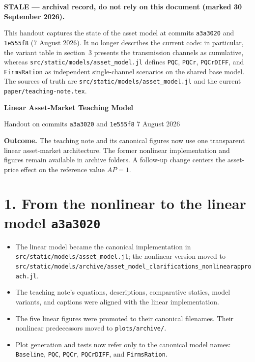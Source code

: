 \documentclass[10pt,a4paper]{article}
\newcommand{\commit}[1]{\texttt{#1}}
\newcommand{\pathcode}[1]{\texttt{\small #1}}
\begin{document}
\small

\colorbox{stale}{%
  \parbox{\dimexpr\textwidth-2\fboxsep\relax}{%
    \color{white}\bfseries STALE --- archival record, do not rely on this
    document (marked 30 September 2026).\par\medskip
    \mdseries This handout captures the state of the asset model at commits
    \commit{a3a3020} and \commit{1e555f8} (7 August 2026). It no longer
    describes the current code: in particular, the variant table in section~3
    presents the transmission channels as cumulative, whereas
    \pathcode{src/static/models/asset\_model.jl} defines \texttt{PQC},
    \texttt{PQCr}, \texttt{PQCrDIFF}, and \texttt{FirmsRation} as independent
    single-channel scenarios on the shared base model. The sources of truth are
    \pathcode{src/static/models/asset\_model.jl} and the current
    \pathcode{paper/teaching-note.tex}.}%
}\par

\vspace{2mm}

{\color{accent}\LARGE\bfseries Linear Asset-Market Teaching Model}\par
{\large Handout on commits \commit{a3a3020} and \commit{1e555f8}}\hfill
{\small 7 August 2026}

\vspace{1mm}
\colorbox{light}{%
  \parbox{\dimexpr\textwidth-2\fboxsep\relax}{%
    \textbf{Outcome.} The teaching note and its canonical figures now use one
    transparent linear asset-market architecture. The former nonlinear
    implementation and figures remain available in archive folders. A follow-up
    change centers the asset-price effect on the reference value $AP=1$.
  }%
}

\section*{1. From the nonlinear to the linear model \hfill\normalfont\commit{a3a3020}}

\begin{itemize}
  \item The linear model became the canonical implementation in
    \pathcode{src/static/models/asset\_model.jl}; the nonlinear version moved to
    \pathcode{src/static/models/archive/asset\_model\_clarifications\_nonlinearapproach.jl}.
  \item The teaching note's equations, descriptions, comparative statics, model
    variants, and captions were aligned with the linear implementation.
  \item The five linear figures were promoted to their canonical filenames.
    Their nonlinear predecessors moved to \pathcode{plots/archive/}.
  \item Plot generation and tests now refer only to the canonical model names:
    \texttt{Baseline}, \texttt{PQC}, \texttt{PQCr}, \texttt{PQCrDIFF}, and
    \texttt{FirmsRation}.
\end{itemize}
\end{document}
